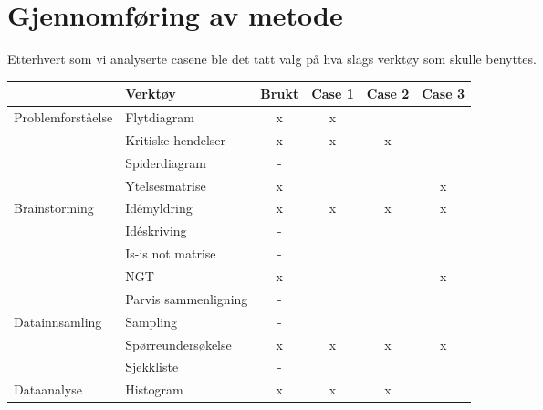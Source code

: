 \chapter{Gjennomføring av metode}
Etterhvert som vi analyserte casene ble det tatt valg på hva slags verktøy som skulle benyttes. 
\begin{table}[htbp]
  \centering
    \begin{tabular}{|l|l|c|r|r|r|}
    \hline
         \cellcolor{yellow} & \cellcolor{yellow} Verktøy & \cellcolor{yellow} Brukt & \multicolumn{1}{c|}{\cellcolor{yellow} Case 1} & \multicolumn{1}{c|}{\cellcolor{yellow} Case 2} & \multicolumn{1}{c|}{\cellcolor{yellow} Case 3} \\
    \hline
    \multicolumn{1}{|l|}{\multirow{4}[8]{*}{Problemforståelse}} & Flytdiagram & x     & \multicolumn{1}{c|}{x} &       &  \\
\cline{2-6}          & Kritiske hendelser & x     & \multicolumn{1}{c|}{x} & \multicolumn{1}{c|}{x} &  \\
\cline{2-6}          & Spiderdiagram & -     &       &       &  \\
\cline{2-6}          & Ytelsesmatrise & x     &       &       & \multicolumn{1}{c|}{x} \\
    \hline
    \multicolumn{1}{|l|}{\multirow{5}[10]{*}{Brainstorming}} & Idémyldring & x     & \multicolumn{1}{c|}{x} & \multicolumn{1}{c|}{x} & \multicolumn{1}{c|}{x} \\
\cline{2-6}          & Idéskriving & -     &       &       &  \\
\cline{2-6}          & Is-is not matrise & -     &       &       &  \\
\cline{2-6}          & NGT   & x     &       &       & \multicolumn{1}{c|}{x} \\
\cline{2-6}          & Parvis sammenligning & -     &       &       &  \\
    \hline
    \multicolumn{1}{|l|}{\multirow{3}[6]{*}{Datainnsamling}} & Sampling & -     &       &       &  \\
\cline{2-6}          & Spørreundersøkelse & x     & \multicolumn{1}{c|}{x} & \multicolumn{1}{c|}{x} & \multicolumn{1}{c|}{x} \\
\cline{2-6}          & Sjekkliste & -     &       &       &  \\
    \hline
    \multicolumn{1}{|l|}{\multirow{6}[12]{*}{Dataanalyse}} & Histogram & x     & \multicolumn{1}{c|}{x} & \multicolumn{1}{c|}{x} &  \\

\end{tabular}
\end{table}
